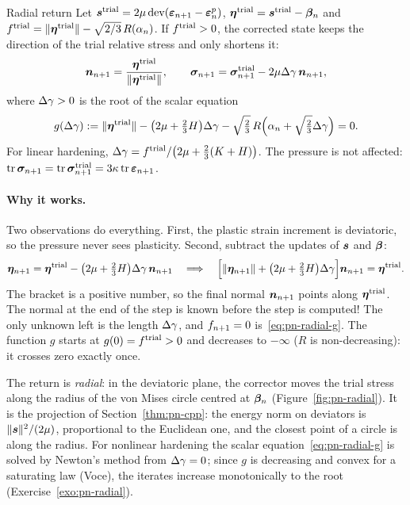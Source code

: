 \begin{gbox}{Radial return}\label{prop:pn-radial}
Let $\bm{s}^{\mathrm{trial}}=2\mu\operatorname{dev}(\bm{\varepsilon}_{n+1}-\bm{\varepsilon}^{p}_n)$,
$\bm{\eta}^{\mathrm{trial}}=\bm{s}^{\mathrm{trial}}-\bm{\beta}_n$ and
$f^{\mathrm{trial}}=\lVert \bm{\eta}^{\mathrm{trial}}\rVert-\sqrt{2/3}\,R(\alpha_n)$. If $f^{\mathrm{trial}}>0$, the
corrected state keeps the direction of the trial relative stress and only
shortens it:
\begin{equation}\label{eq:pn-radial}
  \bm{n}_{n+1}=\frac{\bm{\eta}^{\mathrm{trial}}}{\lVert \bm{\eta}^{\mathrm{trial}}\rVert},\qquad
  \bm{\sigma}_{n+1}=\bm{\sigma}^{\mathrm{trial}}_{n+1}-2\mu\Delta\gamma\,\bm{n}_{n+1},
\end{equation}
where $\Delta\gamma>0$ is the root of the scalar equation
\begin{equation}\label{eq:pn-radial-g}
  g(\Delta\gamma):=\lVert \bm{\eta}^{\mathrm{trial}}\rVert-\bigl(2\mu+\tfrac23H\bigr)\Delta\gamma-\sqrt{\tfrac23}\,R\Bigl(\alpha_n+\sqrt{\tfrac23}\Delta\gamma\Bigr)=0 .
\end{equation}
For linear hardening, $\Delta\gamma=f^{\mathrm{trial}}/\bigl(2\mu+\tfrac23(K+H)\bigr)$. The
pressure is not affected: $\operatorname{tr}\bm{\sigma}_{n+1}=\operatorname{tr}\bm{\sigma}^{\mathrm{trial}}_{n+1}=3\kappa\operatorname{tr}\bm{\varepsilon}_{n+1}$.
\end{gbox}
\paragraph{Why it works.} Two observations do everything. First, the plastic
strain increment is deviatoric, so the pressure never sees plasticity.
Second, subtract the updates of $\bm{s}$ and $\bm{\beta}$:
\[
  \bm{\eta}_{n+1}=\bm{\eta}^{\mathrm{trial}}-\bigl(2\mu+\tfrac23H\bigr)\Delta\gamma\,\bm{n}_{n+1}
  \quad\Longrightarrow\quad
  \Bigl[\lVert \bm{\eta}_{n+1}\rVert+\bigl(2\mu+\tfrac23H\bigr)\Delta\gamma\Bigr]\bm{n}_{n+1}=\bm{\eta}^{\mathrm{trial}} .
\]
The bracket is a positive number, so the final normal $\bm{n}_{n+1}$ points along
$\bm{\eta}^{\mathrm{trial}}$. The normal at the end of the step is known before the step is
computed! The only unknown left is the length $\Delta\gamma$, and $f_{n+1}=0$
is~\eqref{eq:pn-radial-g}. The function $g$ starts at $g(0)=f^{\mathrm{trial}}>0$ and
decreases to $-\infty$ ($R$ is non-decreasing): it crosses zero exactly once.

The return is \emph{radial}: in the deviatoric plane, the corrector moves the
trial stress along the radius of the von Mises circle centred at $\bm{\beta}_n$
(Figure~\ref{fig:pn-radial}). It is the projection of
Section~\ref{thm:pn-cpp}: the energy norm on deviators is
$\lVert \bm{s}\rVert^2/(2\mu)$, proportional to the Euclidean one, and the closest
point of a circle is along the radius. For nonlinear hardening the scalar
equation~\eqref{eq:pn-radial-g} is solved by Newton's method from $\Delta\gamma=0$;
since $g$ is decreasing and convex for a saturating law (Voce), the iterates
increase monotonically to the root (Exercise~\ref{exo:pn-radial}).

